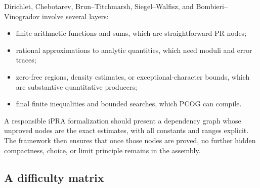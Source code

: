 Dirichlet, Chebotarev, Brun--Titchmarsh, Siegel--Walfisz, and
Bombieri--Vinogradov involve several layers:

\begin{itemize}
\item finite arithmetic functions and sums, which are straightforward PR
nodes;
\item rational approximations to analytic quantities, which need moduli and
error traces;
\item zero-free regions, density estimates, or exceptional-character bounds,
which are substantive quantitative producers;
\item final finite inequalities and bounded searches, which PCOG can compile.
\end{itemize}

A responsible iPRA formalization should present a dependency graph whose
unproved nodes are the exact estimates, with all constants and ranges explicit.
The framework then ensures that once those nodes are proved, no further hidden
compactness, choice, or limit principle remains in the assembly.

\subsection{A difficulty matrix}

